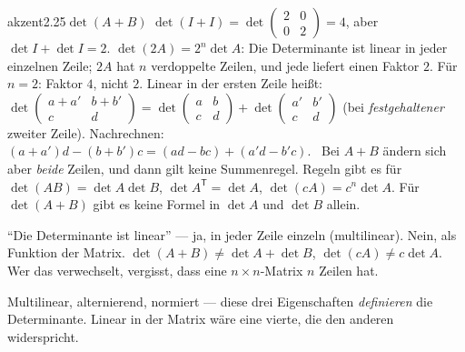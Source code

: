 \begin{loesungkarte}{akzent}{2.25}{$\det(A + B)$}
$\det(I + I) = \det\begin{pmatrix}2 & 0\\ 0 & 2\end{pmatrix} = 4$, aber $\det I + \det I = 2$.
$\det(2A) = 2^{n}\det A$: Die Determinante ist linear in jeder einzelnen Zeile; $2A$ hat $n$ verdoppelte Zeilen, und jede liefert einen Faktor $2$. Für $n = 2$: Faktor $4$, nicht $2$.
Linear in der ersten Zeile heißt: $\det\begin{pmatrix}a + a' & b + b'\\ c & d\end{pmatrix} = \det\begin{pmatrix}a & b\\ c & d\end{pmatrix} + \det\begin{pmatrix}a' & b'\\ c & d\end{pmatrix}$ (bei \emph{festgehaltener} zweiter Zeile). Nachrechnen: $(a + a')d - (b + b')c = (ad - bc) + (a'd - b'c)$. \checkmark\ Bei $A + B$ ändern sich aber \emph{beide} Zeilen, und dann gilt keine Summenregel.
Regeln gibt es für $\det(AB) = \det A\det B$, $\det A^{\mathsf T} = \det A$, $\det(cA) = c^{n}\det A$. Für $\det(A + B)$ gibt es keine Formel in $\det A$ und $\det B$ allein.
\begin{fehler}\kastentext
\enquote{Die Determinante ist linear} --- ja, in jeder Zeile einzeln (multilinear). Nein, als Funktion der Matrix. $\det(A + B)\neq\det A + \det B$, $\det(cA)\neq c\det A$. Wer das verwechselt, vergisst, dass eine $n\times n$-Matrix $n$ Zeilen hat.
\end{fehler}
\begin{mitnehmen}\kastentext
Multilinear, alternierend, normiert --- diese drei Eigenschaften \emph{definieren} die Determinante. Linear in der Matrix wäre eine vierte, die den anderen widerspricht.
\end{mitnehmen}
\end{loesungkarte}

